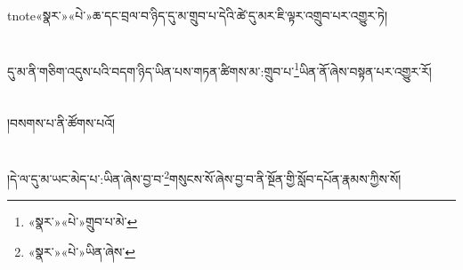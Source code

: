 tnote{«སྣར་»«པེ་»ཆ་}དང་བྲལ་བ་ཉིད་དུ་མ་གྲུབ་པ་དེའི་ཚེ་དུ་མར་ཇི་ལྟར་འགྲུབ་པར་འགྱུར་ཏེ།\chapter{ }དུ་མ་ནི་གཅིག་འདུས་པའི་བདག་ཉིད་ཡིན་པས་གཏན་ཚིགས་མ་:གྲུབ་པ་\footnote{«སྣར་»«པེ་»གྲུབ་པ་མེ་}ཡིན་ནོ་ཞེས་བསྟན་པར་འགྱུར་རོ།\chapter{ }།བསགས་པ་ནི་ཚོགས་པའོ།\chapter{ }།དེ་ལ་དུ་མ་ཡང་མེད་པ་:ཡིན་ཞེས་བྱ་བ་\footnote{«སྣར་»«པེ་»ཡིན་ཞེས་}གསུངས་སོ་ཞེས་བྱ་བ་ནི་སྔོན་གྱི་སློབ་དཔོན་རྣམས་ཀྱིས་སོ།\chapt